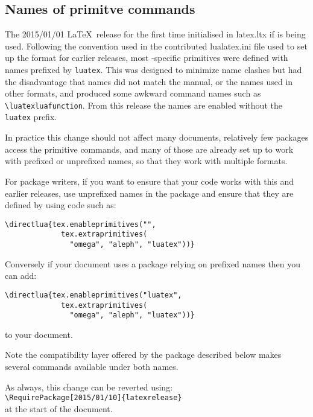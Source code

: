 \documentclass{ltnews}
\begin{document}
\subsection{Names of  primitve commands}

The 2015/01/01 \LaTeX\ release for the first time initialised
 in \textsf{latex.ltx} if  is being
used. Following the convention used in the contributed
\textsf{lualatex.ini} file used to set up the format for earlier
releases, most -specific primitives were defined with
names prefixed by \texttt{luatex}. This was designed to minimize name
clashes but had the disadvantage that names did not match the
 manual, or the names used in other formats, and
produced some awkward command names such as \verb|\luatexluafunction|.
From this release the names are enabled without the \texttt{luatex}
prefix.

In practice this change should not affect many documents, relatively
few packages access the primitive commands, and many of those are
already set up to work with prefixed or unprefixed names, so that they
work with multiple formats.

For package writers, if you want to ensure that your code works with
this and earlier releases, use unprefixed names in the package and
ensure that they are defined by using code such as:
\begin{verbatim}
\directlua{tex.enableprimitives("",
             tex.extraprimitives(
               "omega", "aleph", "luatex"))}
\end{verbatim}
Conversely if your document  uses a package relying on prefixed names
then you can add:
\begin{verbatim}
\directlua{tex.enableprimitives("luatex",
             tex.extraprimitives(
               "omega", "aleph", "luatex"))}
\end{verbatim}
to your document.

Note the compatibility layer offered by the  package
described below makes several commands available under both names.

As always, this change can be reverted using:\\
\verb|\RequirePackage[2015/01/10]{latexrelease}|\\
at the start of the document.
\end{document}
